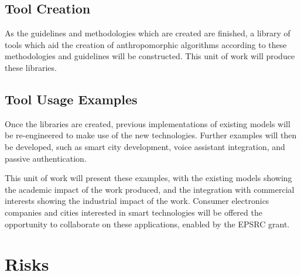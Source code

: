 \subsection{Tool Creation}
As the guidelines and methodologies which are created are finished, a library of tools which aid the creation of anthropomorphic algorithms according to these methodologies and guidelines will be constructed. This unit of work will produce these libraries.\par

\subsection{Tool Usage Examples}
Once the libraries are created, previous implementations of existing models will be re-engineered to make use of the new technologies. Further examples will then be developed, such as smart city development, voice assistant integration, and passive authentication.\par

This unit of work will present these examples, with the existing models showing the academic impact of the work produced, and the integration with commercial interests showing the industrial impact of the work. Consumer electronics companies and cities interested in smart technologies will be offered the opportunity to collaborate on these applications, enabled by the EPSRC grant.\par








\section{Risks}
\label{sec:risks}

